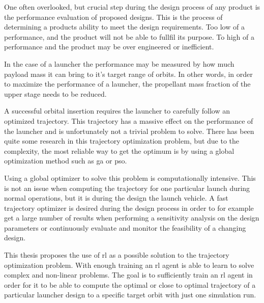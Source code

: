 One often overlooked, but crucial step during the design process of any product is the performance evaluation of proposed designs. This is the process of determining a products ability to meet the design requirements. Too low of a performance, and the product will not be able to fullfil its purpose. To high of a performance and the product may be over engineered or inefficient.

In the case of a launcher the performance may be measured by how much payload mass it can bring to it's target range of orbits. In other words, in order to maximize the performance of a launcher, the propellant mass fraction of the upper stage needs to be reduced.


A successful orbital insertion requires the launcher to carefully follow an optimized trajectory. This trajectory has a massive effect on the performance of the launcher and is unfortunately not a trivial problem to solve. There has been quite some research in this trajectory optimization problem, but due to the complexity, the most reliable way to get the optimum is by using a global optimization method such as \acrfull{ga} or \acrfull{pso}.

Using a global optimizer to solve this problem is computationally intensive. This is not an issue when computing the trajectory for one particular launch during normal operations, but it is during the design the launch vehicle. A fast trajectory optimizer is desired during the design process in order to for example get a large number of results when performing a sensitivity analysis on the design parameters or continuously evaluate and monitor the feasibility of a changing design.

This thesis proposes the use of \acrfull{rl} as a possible solution to the trajectory optimization problem. With enough training an \acrshort{rl} agent is able to learn to solve complex and non-linear problems. The goal is to sufficiently train an \acrshort{rl} agent in order for it to be able to compute the optimal or close to optimal trajectory of a particular launcher design to a specific target orbit with just one simulation run. 

